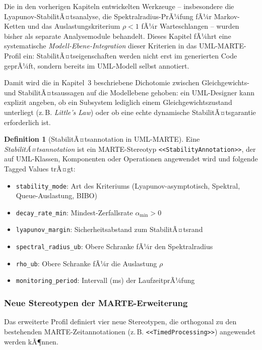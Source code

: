﻿\documentclass[a4paper,12pt]{scrreprt}
\theoremstyle{definition}
\newtheorem{definition}{Definition}[section]
\begin{document}
Die in den vorherigen Kapiteln entwickelten Werkzeuge -- insbesondere die
Lyapunov-StabilitÃ¤tsanalyse, die Spektralradius-PrÃ¼fung fÃ¼r Markov-Ketten
und das Auslastungskriterium $\rho < 1$ fÃ¼r Warteschlangen -- wurden bisher
als separate Analysemodule behandelt. Dieses Kapitel fÃ¼hrt eine systematische
\textit{Modell-Ebene-Integration} dieser Kriterien in das UML-MARTE-Profil
ein: StabilitÃ¤tseigenschaften werden nicht erst im generierten Code geprÃ¼ft,
sondern bereits im UML-Modell selbst annotiert.

Damit wird die in Kapitel~3 beschriebene Dichotomie zwischen Gleichgewichts-
und StabilitÃ¤tsaussagen auf die Modellebene gehoben: ein UML-Designer kann
explizit angeben, ob ein Subsystem lediglich einem Gleichgewichtszustand
unterliegt (z.\,B. \textit{Little's Law}) oder ob eine echte dynamische
StabilitÃ¤tsgarantie erforderlich ist.

\begin{definition}[StabilitÃ¤tsannotation in UML-MARTE]
	Eine \emph{StabilitÃ¤tsannotation} ist ein MARTE-Stereotyp
	\texttt{<<StabilityAnnotation>>}, der auf UML-Klassen, Komponenten oder
	Operationen angewendet wird und folgende Tagged Values trÃ¤gt:
	\begin{itemize}
		\item[-] \texttt{stability\_mode}: Art des Kriteriums
		(Lyapunov-asymptotisch, Spektral, Queue-Auslastung, BIBO)
		\item[-] \texttt{decay\_rate\_min}: Mindest-Zerfallsrate
		$\alpha_{\min} > 0$
		\item[-] \texttt{lyapunov\_margin}: Sicherheitsabstand zum
		StabilitÃ¤tsrand
		\item[-] \texttt{spectral\_radius\_ub}: Obere Schranke fÃ¼r den
		Spektralradius
		\item[-] \texttt{rho\_ub}: Obere Schranke fÃ¼r die Auslastung $\rho$
		\item[-] \texttt{monitoring\_period}: Intervall (ms) der
		LaufzeitprÃ¼fung
	\end{itemize}
\end{definition}

\subsubsection{Neue Stereotypen der MARTE-Erweiterung}

Das erweiterte Profil definiert vier neue Stereotypen, die orthogonal zu
den bestehenden MARTE-Zeitannotationen (z.\,B.
\texttt{<<TimedProcessing>>}) angewendet werden kÃ¶nnen.
\end{document}
